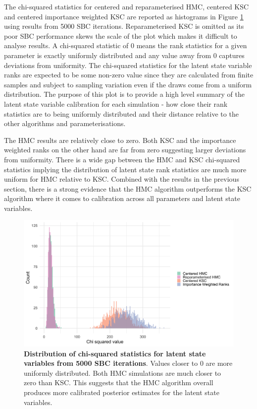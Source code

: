 \documentclass[12pt, a4paper]{article}
\begin{document}
    The chi-squared statistics for centered and reparameterised HMC, centered KSC and centered importance weighted KSC are reported as histograms in Figure \ref{fig:allchisq} using results from 5000 SBC iterations. Reparameterised KSC is omitted as its poor SBC performance skews the scale of the plot which makes it difficult to analyse results. A chi-squared statistic of 0 means the rank statistics for a given parameter is exactly uniformly distributed and any value away from 0 captures deviations from uniformity. The chi-squared statistics for the latent state variable ranks are expected to be some non-zero value since they are calculated from finite samples and subject to sampling variation even if the draws come from a uniform distribution. The purpose of this plot is to provide a high level summary of the latent state variable calibration for each simulation - how close their rank statistics are to being uniformly distributed and their distance relative to the other algorithms and parameterisations. 
    
    The HMC results are relatively close to zero. Both KSC and the importance weighted ranks on the other hand are far from zero suggesting larger deviations from uniformity. There is a wide gap between the HMC and KSC chi-squared statistics implying the distribution of latent state rank statistics are much more  uniform for HMC relative to KSC. Combined with the results in the previous section, there is a strong evidence that the HMC algorithm outperforms the KSC algorithm where it comes to calibration across all parameters and latent state variables.

    \begin{figure}[H]
        \centering
        \includegraphics[scale=0.1]{results/dist_chisq_all.png}
        \caption{\textbf{Distribution of chi-squared statistics for latent state variables from 5000 SBC iterations}. Values closer to 0 are more uniformly distributed. Both HMC simulations are much closer to zero than KSC. This suggests that the HMC algorithm overall produces more calibrated posterior estimates for the latent state variables.}
        \label{fig:allchisq}
    \end{figure}
\end{document}
